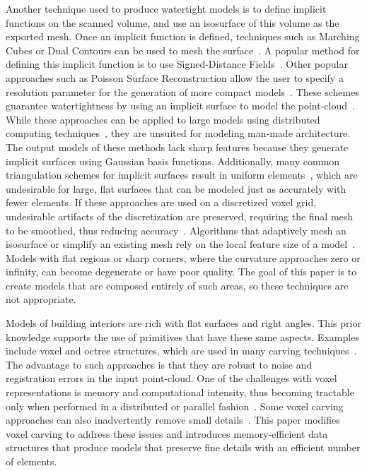 \documentclass[12pt,onecolumn,oneside]{book}
\begin{document}
Another technique used to produce watertight models is to define implicit functions on the scanned volume, and use an isosurface of this volume as the exported mesh.  Once an implicit function is defined, techniques such as Marching Cubes or Dual Contours can be used to mesh the surface~\cite{MarchingCubes,DualContouring}. A popular method for defining this implicit function is to use Signed-Distance Fields~\cite{SignedDistanceFields}.  Other popular approaches such as Poisson Surface Reconstruction allow the user to specify a resolution parameter for the generation of more compact models~\cite{Poisson}.  These schemes guarantee watertightness by using an implicit surface to model the point-cloud~\cite{UnorganizedPoints}.  While these approaches can be applied to large models using distributed computing techniques~\cite{OutOfCorePoisson,ParallelPoisson}, they are unsuited for modeling man-made architecture.  The output models of these methods lack sharp features because they generate implicit surfaces using Gaussian basis functions.  Additionally, many common triangulation schemes for implicit surfaces result in uniform elements~\cite{DualContouring,MarchingCubes}, which are undesirable for large, flat surfaces that can be modeled just as accurately with fewer elements.  If these approaches are used on a discretized voxel grid, undesirable artifacts of the discretization are preserved, requiring the final mesh to be smoothed, thus reducing accuracy~\cite{Carving}.  Algorithms that adaptively mesh an isosurface or simplify an existing mesh rely on the local feature size of a model~\cite{QEM,ProgressiveMesh,Isostuffing,AdaptiveMeshing}.  Models with flat regions or sharp corners, where the curvature approaches zero or infinity, can become degenerate or have poor quality.  The goal of this paper is to create models that are composed entirely of such areas, so these techniques are not appropriate.

Models of building interiors are rich with flat surfaces and right angles.  This prior knowledge supports the use of primitives that have these same aspects.  Examples include voxel and octree structures, which are used in many carving techniques~\cite{OctreeSculpting,Carving,SpaceTime,VoxelSurfaceArea,Yang05}.  The advantage to such approaches is that they are robust to noise and registration errors in the input point-cloud.  One of the challenges with voxel representations is memory and computational intensity, thus becoming tractable only when performed in a distributed or parallel fashion~\cite{ParallelOctree}.  Some voxel carving approaches can also inadvertently remove small details~\cite{Carving}.  This paper modifies voxel carving to address these issues and introduces memory-efficient data structures that produce models that preserve fine details with an efficient number of elements.
\end{document}
